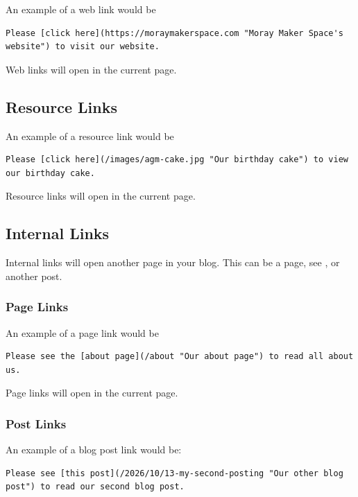 An example of a web link would be

\begin{lstlisting}[style=myText]
Please [click here](https://moraymakerspace.com "Moray Maker Space's website") to visit our website.
\end{lstlisting}

Web links will open in the current page.

\subsection{Resource Links}\label{sect: Resource Links}

An example of a resource link would be

\begin{lstlisting}[style=myText]
Please [click here](/images/agm-cake.jpg "Our birthday cake") to view our birthday cake.
\end{lstlisting}

Resource links will open in the current page.

\subsection{Internal  Links}\label{sect: Internal Links}

Internal links will open another page in your blog. This can be a page, see , or another post.

\subsubsection{Page Links}

An example of a page link would be

\begin{lstlisting}[style=myText]
Please see the [about page](/about "Our about page") to read all about us.
\end{lstlisting}

Page links will open in the current page.

\subsubsection{Post Links}

An example of a blog post link would be:

\begin{lstlisting}[style=myText]
Please see [this post](/2026/10/13-my-second-posting "Our other blog post") to read our second blog post.
\end{lstlisting}

